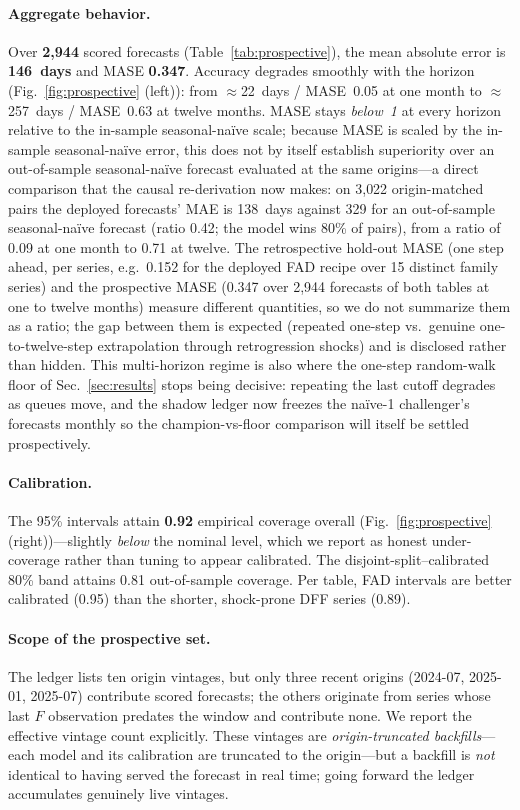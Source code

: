 \documentclass[runningheads]{llncs}
\begin{document}
\paragraph{Aggregate behavior.} Over \textbf{2{,}944} scored
forecasts (Table~\ref{tab:prospective}), the mean absolute error is
\textbf{146~days} and MASE \textbf{0.347}. Accuracy degrades smoothly with the
horizon (Fig.~\ref{fig:prospective} (left)): from $\approx$22~days / MASE~0.05 at one month to
$\approx$257~days / MASE~0.63 at twelve months. MASE stays \emph{below~1} at every
horizon relative to the in-sample seasonal-naïve scale; because MASE is scaled by
the in-sample seasonal-naïve error, this does not by itself establish superiority
over an out-of-sample seasonal-naïve forecast evaluated at the same origins---a
direct comparison that the causal re-derivation now makes: on 3{,}022 origin-matched
pairs the deployed forecasts' MAE is 138~days against 329 for an out-of-sample
seasonal-naïve forecast (ratio 0.42; the model wins 80\% of pairs), from a ratio of 0.09
at one month to 0.71 at twelve. The retrospective hold-out MASE (one step ahead, per
series, e.g.\ 0.152 for the deployed FAD recipe over 15 distinct family series) and the
prospective MASE (0.347 over 2{,}944 forecasts of both tables at one to twelve months)
measure different quantities, so we do not summarize them as a ratio; the gap between
them is expected (repeated one-step vs.\ genuine one-to-twelve-step extrapolation
through retrogression shocks) and is disclosed rather than hidden. This multi-horizon regime is also where the one-step
random-walk floor of Sec.~\ref{sec:results} stops being decisive: repeating the last
cutoff degrades as queues move, and the shadow ledger now freezes the naïve-1
challenger's forecasts monthly so the champion-vs-floor comparison will itself be
settled prospectively.

\paragraph{Calibration.} The 95\% intervals attain \textbf{0.92} empirical coverage
overall (Fig.~\ref{fig:prospective} (right))---slightly \emph{below} the nominal level,
which we report as honest under-coverage rather than tuning to appear calibrated.
The disjoint-split--calibrated 80\% band attains 0.81 out-of-sample coverage. Per
table, FAD intervals are better calibrated (0.95) than the shorter, shock-prone DFF
series (0.89).

\paragraph{Scope of the prospective set.} The ledger lists ten origin vintages, but
only three recent origins (2024-07, 2025-01, 2025-07) contribute scored forecasts;
the others originate from series whose last $F$ observation predates the window and
contribute none. We report the effective vintage count explicitly. These vintages
are \emph{origin-truncated backfills}---each model and its calibration are truncated
to the origin---but a backfill is \emph{not} identical to having served the forecast
in real time; going forward the ledger accumulates genuinely live vintages.
\end{document}
